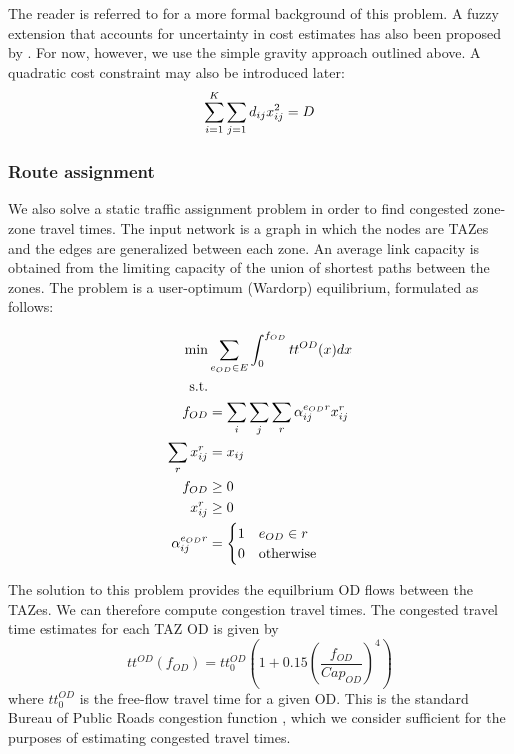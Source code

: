 \documentclass[11pt,twoside]{article}
\numberwithin{equation}{section}
\newcommand{\lt}{\left}
\newcommand{\rt}{\right}
\newcommand{\?}{\stackrel{?}{=}}
\newcommand{\fr}{\frac}
\begin{document}
The reader is referred to \citet{fang1995linearly} for a more formal background of this problem.
A fuzzy extension that accounts for uncertainty in cost estimates has also been proposed by \citet{li2011entropy}.
For now, however, we use the simple gravity approach outlined above.
A quadratic cost constraint may also be introduced later:
\begin{equation}
   \sum_{i=1}^K\sum_{j=1} d_{ij}x_{ij}^2 = D \\
\end{equation}



\subsubsection{Route assignment}
We also solve a static traffic assignment problem in order to find congested zone-zone travel times.
The input network is a graph in which the nodes are TAZes and the edges are generalized between each zone.
An average link capacity is obtained from the limiting capacity of the union of shortest paths between the zones.
The problem is a user-optimum (Wardorp) equilibrium, formulated as follows:

\begin{align}
  \min & \sum_{e_{OD} \in E} \int_{0}^{f_{OD}}tt^{OD}(x) dx \\ \notag
  \text{s.t.} & \\
  f_{OD} &= \sum_{i}\sum_{j}\sum_{r}\alpha_{ij}^{e_{OD}r}x_{ij}^{r}\\
  \sum_r x_{ij}^{r} &= x_{ij} \\
  f_{OD} &\ge 0 \\
  x_{ij}^{r}& \ge 0 \\
  \alpha_{ij}^{e_{OD}r} &=
                          \begin{cases}
                            1 & e_{OD} \in r \\
                            0 & \text{otherwise}
                          \end{cases}
\end{align}

The solution to this problem provides the equilbrium OD flows between the TAZes.
We can therefore compute congestion travel times.
The congested travel time estimates for each TAZ OD is given by
\begin{equation}
  \label{eq:tt}
  tt^{OD}(f_{OD}) = tt_0^{OD}\lt(1 + 0.15\lt( \fr{f_{OD}}{Cap_{OD}}\rt)^4\rt)
\end{equation}
where $tt_0^{OD}$ is the free-flow travel time for a given OD. 
This is the standard Bureau of Public Roads congestion function \citep{mtoi2014calibration}, which we consider sufficient for the purposes of estimating congested travel times.
\end{document}
